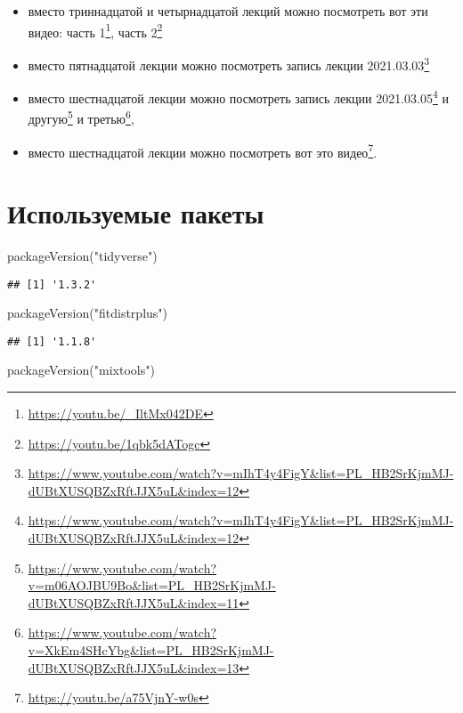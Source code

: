 \documentclass[
]{book}
\newenvironment{Shaded}{\begin{snugshade}}{\end{snugshade}}
\newcommand{\FunctionTok}[1]{\textcolor[rgb]{0.00,0.00,0.00}{#1}}
\newcommand{\NormalTok}[1]{#1}
\newcommand{\StringTok}[1]{\textcolor[rgb]{0.31,0.60,0.02}{#1}}
\renewcommand{\href}[2]{#2\footnote{\url{#1}}}
\begin{document}
\begin{itemize}
\item
  вместо триннадцатой и четырнадцатой лекций можно посмотреть вот эти видео: \href{https://youtu.be/_IltMx042DE}{часть 1}, \href{https://youtu.be/1qbk5dATogc}{часть 2}
\item
  вместо пятнадцатой лекции можно посмотреть \href{https://www.youtube.com/watch?v=mIhT4y4FigY\&list=PL_HB2SrKjmMJ-dUBtXUSQBZxRftJJX5uL\&index=12}{запись лекции 2021.03.03}
\item
  вместо шестнадцатой лекции можно посмотреть
  \href{https://www.youtube.com/watch?v=mIhT4y4FigY\&list=PL_HB2SrKjmMJ-dUBtXUSQBZxRftJJX5uL\&index=12}{запись лекции 2021.03.05} и
  \href{https://www.youtube.com/watch?v=m06AOJBU9Bo\&list=PL_HB2SrKjmMJ-dUBtXUSQBZxRftJJX5uL\&index=11}{другую} и
  \href{https://www.youtube.com/watch?v=XkEm4SHcYbg\&list=PL_HB2SrKjmMJ-dUBtXUSQBZxRftJJX5uL\&index=13}{третью},
\item
  вместо шестнадцатой лекции можно посмотреть вот это \href{https://youtu.be/a75VjnY-w0s}{видео}.
\end{itemize}

\hypertarget{ux438ux441ux43fux43eux43bux44cux437ux443ux435ux43cux44bux435-ux43fux430ux43aux435ux442ux44b}{%
\section{Используемые пакеты}\label{ux438ux441ux43fux43eux43bux44cux437ux443ux435ux43cux44bux435-ux43fux430ux43aux435ux442ux44b}}

\begin{Shaded}
\begin{Highlighting}[]
\FunctionTok{packageVersion}\NormalTok{(}\StringTok{"tidyverse"}\NormalTok{)}
\end{Highlighting}
\end{Shaded}

\begin{verbatim}
## [1] '1.3.2'
\end{verbatim}

\begin{Shaded}
\begin{Highlighting}[]
\FunctionTok{packageVersion}\NormalTok{(}\StringTok{"fitdistrplus"}\NormalTok{)}
\end{Highlighting}
\end{Shaded}

\begin{verbatim}
## [1] '1.1.8'
\end{verbatim}

\begin{Shaded}
\begin{Highlighting}[]
\FunctionTok{packageVersion}\NormalTok{(}\StringTok{"mixtools"}\NormalTok{)}
\end{Highlighting}
\end{Shaded}
\end{document}
